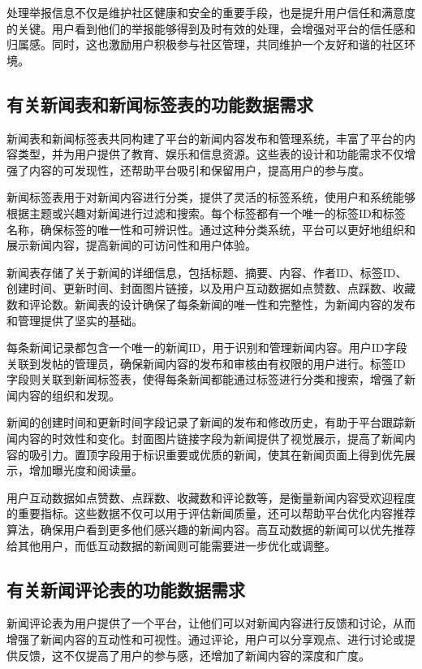 处理举报信息不仅是维护社区健康和安全的重要手段，也是提升用户信任和满意度的关键。用户看到他们的举报能够得到及时有效的处理，会增强对平台的信任感和归属感。同时，这也激励用户积极参与社区管理，共同维护一个友好和谐的社区环境。

\subsection{有关新闻表和新闻标签表的功能数据需求}

新闻表和新闻标签表共同构建了平台的新闻内容发布和管理系统，丰富了平台的内容类型，并为用户提供了教育、娱乐和信息资源。这些表的设计和功能需求不仅增强了内容的可发现性，还帮助平台吸引和保留用户，提高用户的参与度。

新闻标签表用于对新闻内容进行分类，提供了灵活的标签系统，使用户和系统能够根据主题或兴趣对新闻进行过滤和搜索。每个标签都有一个唯一的标签ID和标签名称，确保标签的唯一性和可辨识性。通过这种分类系统，平台可以更好地组织和展示新闻内容，提高新闻的可访问性和用户体验。

新闻表存储了关于新闻的详细信息，包括标题、摘要、内容、作者ID、标签ID、创建时间、更新时间、封面图片链接，以及用户互动数据如点赞数、点踩数、收藏数和评论数。新闻表的设计确保了每条新闻的唯一性和完整性，为新闻内容的发布和管理提供了坚实的基础。

每条新闻记录都包含一个唯一的新闻ID，用于识别和管理新闻内容。用户ID字段关联到发帖的管理员，确保新闻内容的发布和审核由有权限的用户进行。标签ID字段则关联到新闻标签表，使得每条新闻都能通过标签进行分类和搜索，增强了新闻内容的组织和发现。

新闻的创建时间和更新时间字段记录了新闻的发布和修改历史，有助于平台跟踪新闻内容的时效性和变化。封面图片链接字段为新闻提供了视觉展示，提高了新闻内容的吸引力。置顶字段用于标识重要或优质的新闻，使其在新闻页面上得到优先展示，增加曝光度和阅读量。

用户互动数据如点赞数、点踩数、收藏数和评论数等，是衡量新闻内容受欢迎程度的重要指标。这些数据不仅可以用于评估新闻质量，还可以帮助平台优化内容推荐算法，确保用户看到更多他们感兴趣的新闻内容。高互动数据的新闻可以优先推荐给其他用户，而低互动数据的新闻则可能需要进一步优化或调整。

\subsection{有关新闻评论表的功能数据需求}

新闻评论表为用户提供了一个平台，让他们可以对新闻内容进行反馈和讨论，从而增强了新闻内容的互动性和可视性。通过评论，用户可以分享观点、进行讨论或提供反馈，这不仅提高了用户的参与感，还增加了新闻内容的深度和广度。

